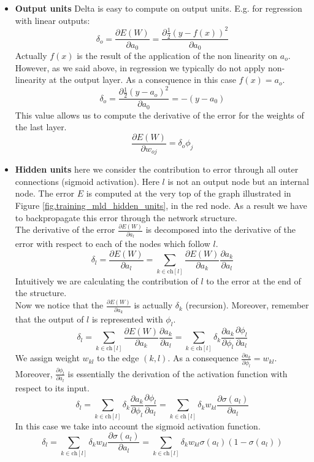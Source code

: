 \begin{itemize}
    \item \textbf{Output units}
    Delta is easy to compute on output units. E.g. for regression with linear outputs:
    $$\delta_o = \frac{\partial E(W)}{\partial a_0} = \frac{\partial \frac{1}{2} (y-f(x))^2}{\partial a_0}$$
    Actually $f(x)$ is the result of the application of the non linearity on $a_o$. However, as we said above, in regression we typically do not apply non-linearity at the output layer. As a consequence in this case $f(x)=a_o$.
    $$\delta_o = \frac{\partial \frac{1}{2} (y-a_o)^2}{\partial a_0} = -(y-a_0)$$
    This value allows us to compute the derivative of the error for the weights of the last layer.
    $$\frac{\partial E(W)}{\partial w_{oj}} = \delta_o \phi_j$$
    
    \item \textbf{Hidden units} here we consider the contribution to error through all outer connections (sigmoid activation). Here $l$ is not an output node but an internal node. The error $E$ is computed at the very top of the graph illustrated in Figure \ref{fig.training_mld_hidden_units}, in the red node. As a result we have to backpropagate this error through the network structure.\\
    The derivative of the error $\frac{\partial E(W)}{\partial a_l}$ is decomposed into the derivative of the error with respect to each of the nodes which follow $l$.
    $$\delta_l = \frac{\partial E(W)}{\partial a_l} = \sum_{k \in \text{ch}[l]} \frac{\partial E(W)}{\partial a_k} \frac{\partial a_k}{\partial a_l}$$
    Intuitively we are calculating the contribution of $l$ to the error at the end of the structure.\\
    Now we notice that the $\frac{\partial E(W)}{\partial a_k}$ is actually $\delta_k$ (recursion). Moreover, remember that the output of $l$ is represented with $\phi_l$.
    $$\delta_l = \sum_{k \in \text{ch}[l]} \frac{\partial E(W)}{\partial a_k} \frac{\partial a_k}{\partial a_l} = \sum_{k \in \text{ch}[l]} \delta_k \frac{\partial a_k}{\partial \phi_l} \frac{\partial \phi_l}{\partial a_l}$$
    We assign weight $w_{kl}$ to the edge $(k,l)$. As a consequence $\frac{\partial a_k}{\partial \phi_l} = w_{kl}$. Moreover, $\frac{\partial \phi_l}{\partial a_l}$ is essentially the derivation of the activation function with respect to its input.
    $$\delta_l = \sum_{k \in \text{ch}[l]} \delta_k \frac{\partial a_k}{\partial \phi_l} \frac{\partial \phi_l}{\partial a_l} = \sum_{k \in \text{ch}[l]} \delta_k w_{kl} \frac{\partial \sigma(a_l)}{\partial a_l}$$
    In this case we take into account the sigmoid activation function.
    $$\delta_l = \sum_{k \in \text{ch}[l]} \delta_k w_{kl} \frac{\partial \sigma(a_l)}{\partial a_l} = \sum_{k \in \text{ch}[l]} \delta_k w_{kl} \sigma(a_l) (1 - \sigma(a_l))$$
\end{itemize}

